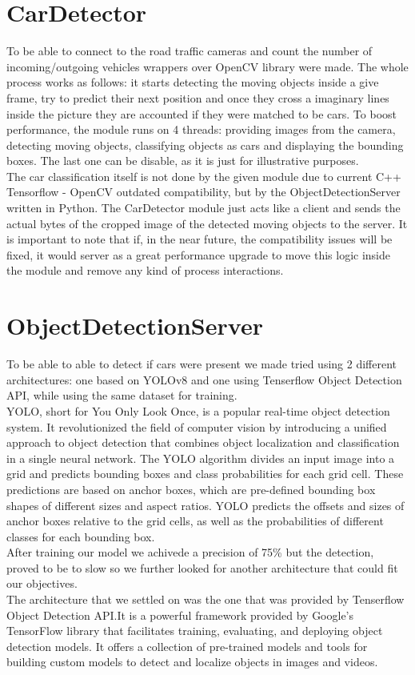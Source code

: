 \documentclass[17pt]{report}
\begin{document}
\section{CarDetector}
\indent \indent
To be able to connect to the road traffic cameras and count the number of 
incoming/outgoing vehicles wrappers over OpenCV library were made. The whole process 
works as follows: it starts detecting the moving objects inside a give frame, try to 
predict their next position and once they cross a imaginary lines inside the picture
they are accounted if they were matched to be cars. To boost performance, the 
module runs on 4 threads: providing images from the camera, detecting moving objects,
classifying objects as cars and displaying the bounding boxes. The last one can be 
disable, as it is just for illustrative purposes. \\

\indent \indent
The car classification itself is 
not done by the given module due to current C++ Tensorflow - OpenCV outdated compatibility,
but by the ObjectDetectionServer written in Python. The CarDetector module just acts 
like a client and sends the actual bytes of the cropped image of the detected moving objects 
to the server. It is important to note that if, in the near future, the compatibility issues
will be fixed, it would server as a great performance upgrade to move this logic
inside the module and remove any kind of process interactions.


\section{ObjectDetectionServer} 
\indent \indent
To be able to able to detect if cars were present we made tried using 2 different 
architectures: one based on YOLOv8 and one using Tenserflow Object Detection API, 
while using the same dataset for training.\\
\indent \indent
YOLO, short for You Only Look Once, is a popular real-time object detection system.
It revolutionized the field of computer vision by introducing a unified approach to
object detection that combines object localization and classification in a single
neural network. The YOLO algorithm divides an input image into a grid and predicts
bounding boxes and class probabilities for each grid cell. These predictions are
based on anchor boxes, which are pre-defined bounding box shapes of different sizes
and aspect ratios. YOLO predicts the offsets and sizes of anchor boxes relative to
the grid cells, as well as the probabilities of different classes for each bounding
box. \\
After training our model we achivede a precision of 75\% but the detection, proved 
to be to slow so we further looked for another architecture that could fit our objectives. \\
The architecture that we settled on was the one that was provided by Tenserflow
Object Detection API.It is a powerful framework provided by Google's TensorFlow
library that facilitates training, evaluating, and deploying object detection
models. It offers a collection of pre-trained models and tools for building custom
models to detect and localize objects in images and videos. 
\end{document}
